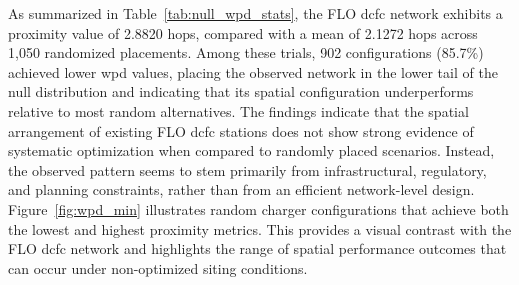 As summarized in Table~\ref{tab:null_wpd_stats}, the FLO \gls{dcfc} network exhibits a proximity value of 2.8820 hops, compared with a mean of 2.1272 hops across 1,050 randomized placements. Among these trials, 902 configurations (85.7\%) achieved lower \gls{wpd} values, placing the observed network in the lower tail of the null distribution and indicating that its spatial configuration underperforms relative to most random alternatives.
The findings indicate that the spatial arrangement of existing FLO \gls{dcfc} stations does not show strong evidence of systematic optimization when compared to randomly placed scenarios. Instead, the observed pattern seems to stem primarily from infrastructural, regulatory, and planning constraints, rather than from an efficient network-level design. 
Figure~\ref{fig:wpd_min} illustrates random charger configurations that achieve both the lowest and highest proximity metrics. This provides a visual contrast with the FLO \gls{dcfc} network and highlights the range of spatial performance outcomes that can occur under non-optimized siting conditions.

